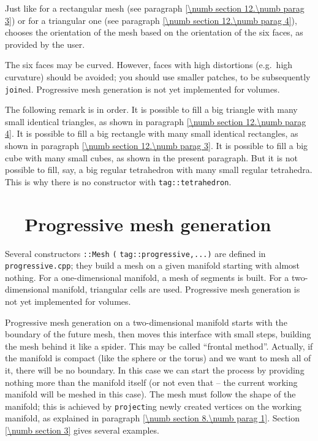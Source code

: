 Just like for a rectangular mesh (see paragraph \ref{\numb section 12.\numb parag 3}) or for
a triangular one (see paragraph \ref{\numb section 12.\numb parag 4}),
{\maniFEM} chooses the orientation of the mesh based on the orientation of the six faces,
as provided by the user.

The six faces may be curved.
However, faces with high distortions (e.g.\ high curvature) should be avoided;
you should use smaller patches, to be subsequently {\small\tt join}ed.
Progressive mesh generation is not yet implemented for volumes.

The following remark is in order.
It is possible to fill a big triangle with many small identical triangles, as shown in paragraph
\ref{\numb section 12.\numb parag 4}.
It is possible to fill a big rectangle with many small identical rectangles, as shown in paragraph
\ref{\numb section 12.\numb parag 3}.
It is possible to fill a big cube with many small cubes, as shown in the present paragraph.
But it is not possible to fill, say, a big regular tetrahedron with many small regular tetrahedra.
This is why there is no {\small\tt{}} constructor with
{\small\tt\textcolor{tag}{tag}::tetrahedron}.


\section{~~Progressive mesh generation}\label{\numb section 12.\numb parag 6}

Several constructors {\small\tt {}::Mesh} {\small\tt(}
{\small\tt\textcolor{tag}{tag}::progressive,...)} are defined in {\small\tt progressive.cpp};
they build a mesh on a given manifold starting with almost nothing.
For a one-dimensional manifold, a mesh of segments is built.
For a two-dimensional manifold, triangular cells are used.
Progressive mesh generation is not yet implemented for volumes.

Progressive mesh generation on a two-dimensional manifold starts with the boundary of
the future mesh, then moves this interface with small steps, building the mesh behind it
like a spider.
This may be called ``frontal method''.
Actually, if the manifold is compact (like the sphere or the torus) and we want to mesh
all of it, there will be no boundary.
In this case we can start the process by providing nothing more than the manifold itself
(or not even that -- the current working manifold will be meshed in this case).
The mesh must follow the shape of the manifold; this is achieved by {\small\tt project}ing
newly created vertices on the working manifold, as explained in paragraph
\ref{\numb section 8.\numb parag 1}.
Section \ref{\numb section 3} gives several examples.

